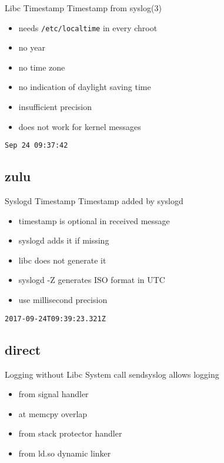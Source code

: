 \documentclass[14pt]{beamer}
\begin{document}
\begin{frame}{Libc Timestamp}
    Timestamp from syslog(3)
\begin{itemize}
    \item needs \texttt{/etc/localtime} in every chroot
    \item no year
    \item no time zone
    \item no indication of daylight saving time
    \item insufficient precision
    \item does not work for kernel messages
\end{itemize}
    \vspace{.5cm}
    \texttt{Sep 24 09:37:42}
\end{frame}

\subsection{zulu}

\begin{frame}{Syslogd Timestamp}
    Timestamp added by syslogd
\begin{itemize}
    \item timestamp is optional in received message
    \item syslogd adds it if missing
    \item libc does not generate it
    \item syslogd -Z generates ISO format in UTC
    \item use millisecond precision
\end{itemize}
    \vspace{.5cm}
    \texttt{2017-09-24T09:39:23.321Z}
\end{frame}

\subsection{direct}

\begin{frame}{Logging without Libc}
    System call sendsyslog allows logging
\begin{itemize}
    \item from signal handler
    \item at memcpy overlap
    \item from stack protector handler
    \item from ld.so dynamic linker
\end{itemize}
\end{frame}
\end{document}
